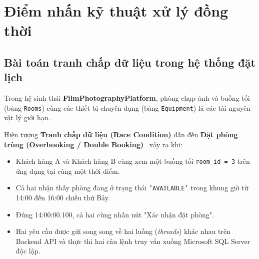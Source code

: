 \section{Điểm nhấn kỹ thuật xử lý đồng thời}

\subsection{Bài toán tranh chấp dữ liệu trong hệ thống đặt lịch}
Trong hệ sinh thái \textbf{FilmPhotographyPlatform}, phòng chụp ảnh và buồng tối (bảng \texttt{Rooms}) cùng các thiết bị chuyên dụng (bảng \texttt{Equipment}) là các tài nguyên vật lý giới hạn. 

Hiện tượng \textbf{Tranh chấp dữ liệu (Race Condition)} dẫn đến \textbf{Đặt phòng trùng (Overbooking / Double Booking)}~\cite{zhao2023efficiently} xảy ra khi:
\begin{itemize}[leftmargin=2em]
    \item Khách hàng A và Khách hàng B cùng xem một buồng tối \texttt{room\_id = 3} trên ứng dụng tại cùng một thời điểm.
    \item Cả hai nhận thấy phòng đang ở trạng thái \texttt{'AVAILABLE'} trong khung giờ từ 14:00 đến 16:00 chiều thứ Bảy.
    \item Đúng 14:00:00.100, cả hai cùng nhấn nút "Xác nhận đặt phòng".
    \item Hai yêu cầu được gửi song song về hai luồng (\textit{threads}) khác nhau trên Backend API và thực thi hai câu lệnh truy vấn xuống Microsoft SQL Server độc lập.
\end{itemize}

